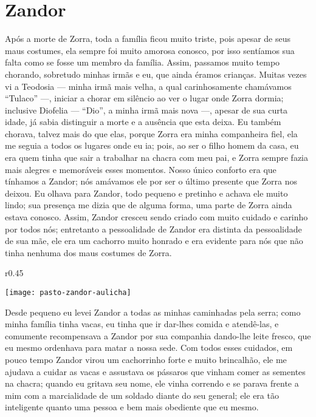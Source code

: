 \cleardoublepage
\newpage
{}
\chapter{Zandor}

Após a morte de Zorra, toda a família ficou muito triste, pois apesar de seus maus costumes, ela sempre foi muito amorosa conosco, por isso sentíamos sua falta como se fosse um membro da família. 
Assim, passamos muito tempo chorando, sobretudo minhas irmãs e eu, que ainda éramos crianças. 
Muitas vezes vi a Teodosia ---  minha irmã mais velha, a qual carinhosamente chamávamos ``Tulaco'' ---, iniciar a chorar em silêncio ao ver o lugar onde Zorra dormia; inclusive Diofelia  --- ``Dio'', a minha irmã mais nova ---, apesar de sua curta idade, já sabia distinguir a morte e a ausência que esta deixa. 
Eu também chorava, talvez mais do que elas, porque Zorra era minha companheira fiel, ela me seguia a todos os lugares onde eu ia; pois, ao ser o filho homem da casa, eu era quem tinha que sair a trabalhar na chacra com meu pai, e Zorra sempre fazia mais alegres e memoráveis esses momentos.
Nosso único conforto era que tínhamos a Zandor; nós amávamos ele por ser o último presente que Zorra nos deixou.
Eu olhava para Zandor, todo pequeno e pretinho e achava ele muito lindo; sua presença me dizia que de alguma forma, uma parte de Zorra ainda estava conosco. 
Assim, Zandor cresceu sendo criado com muito cuidado e carinho por todos nós;
entretanto a pessoalidade de Zandor era distinta da pessoalidade de sua mãe, ele era um cachorro muito honrado e era evidente para nós que não tinha nenhuma dos maus costumes de Zorra. 
\begin{wrapfigure}{r}{0.45\textwidth}
  \begin{center}
  \vspace{-20pt}
    \texttt{[image: pasto-zandor-aulicha]}
  \end{center}
  \vspace{-20pt}
\end{wrapfigure}
Desde pequeno eu levei Zandor a todas as minhas caminhadas pela serra; como minha família tinha vacas, eu tinha que ir dar-lhes comida e atendê-las, e comumente recompensava a Zandor por sua companhia dando-lhe leite fresco, que eu mesmo ordenhava para matar a nossa sede. 
Com todos esses cuidados, em pouco tempo Zandor virou um cachorrinho forte e muito brincalhão,
ele me ajudava a cuidar as vacas e assustava os pássaros que vinham comer as sementes na chacra; quando eu gritava seu nome, ele vinha correndo e se parava frente a mim com a marcialidade de um soldado diante do seu general; ele era tão inteligente quanto uma pessoa e bem mais obediente que eu mesmo.

